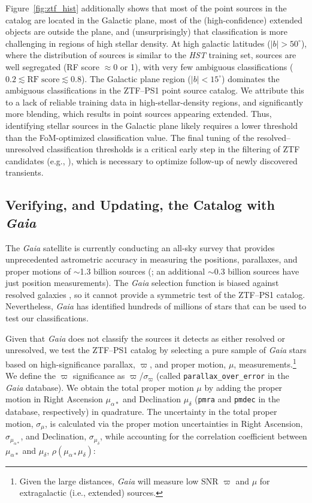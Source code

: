\documentclass[twocolumn]{aastex62}
\begin{document}
\begin{CJK*}{UTF8}{gbsn}
Figure~\ref{fig:ztf_hist} additionally shows that most of the point sources
in the catalog are located in the Galactic plane, most of the
(high-confidence) extended objects are outside the plane, and
(unsurprisingly) that classification is more challenging in regions of high
stellar density. At high galactic latitudes ($|b| > 50^{\circ}$), where the
distribution of sources is similar to the \textit{HST} training set, sources
are well segregated (RF score $\approx$0 or 1), with very few ambiguous
classifications ($0.2 \lesssim \mathrm{RF\;score} \lesssim 0.8$). The
Galactic plane region ($|b| < 15^{\circ}$) dominates the ambiguous
classifications in the ZTF--PS1 point source catalog. We attribute this to a
lack of reliable training data in high-stellar-density regions, and
significantly more blending, which results in point sources appearing
extended. Thus, identifying stellar sources in the Galactic plane likely
requires a lower threshold than the FoM-optimized classification value. The
final tuning of the resolved--unresolved classification thresholds is a
critical early step in the filtering of ZTF candidates (e.g.,
\citealt{Kasliwal:18:ZTF}), which is necessary to optimize follow-up of
newly discovered transients.

\subsection{Verifying, and Updating, the Catalog with \textit{Gaia}}
\label{sec:gaia}

The \textit{Gaia} satellite \citep{Gaia-Collaboration16} is currently
conducting an all-sky survey that provides unprecedented astrometric
accuracy in measuring the positions, parallaxes, and proper motions of
$\sim$1.3 billion sources (\citealt{Gaia-Collaboration18}; an additional
$\sim$0.3 billion sources have just position measurements). The
\textit{Gaia} selection function is biased against resolved galaxies
\citep{Gaia-Collaboration16}, so it cannot provide a symmetric test of the
ZTF--PS1 catalog. Nevertheless, \textit{Gaia} has identified hundreds of
millions of stars that can be used to test our classifications.

Given that \textit{Gaia} does not classify the sources it detects as either
resolved or unresolved, we test the ZTF--PS1 catalog by selecting a pure
sample of \textit{Gaia} stars based on high-significance parallax, $\varpi$,
and proper motion, $\mu$, measurements.\footnote{Given the large distances,
\textit{Gaia} will measure low SNR $\varpi$ and $\mu$ for extragalactic
(i.e., extended) sources.} We define the $\varpi$ significance as
$\varpi$/$\sigma_\varpi$ (called \texttt{parallax\_over\_error} in the
\textit{Gaia} database). We obtain the total proper motion $\mu$ by adding
the proper motion in Right Ascension $\mu_{\alpha\ast}$ and Declination
$\mu_{\delta}$ (\texttt{pmra} and \texttt{pmdec} in the database,
respectively) in quadrature. The uncertainty in the total proper motion,
$\sigma_\mu$, is calculated via the proper motion uncertainties in Right
Ascension, $\sigma_{\mu_{\alpha\ast}}$, and Declination,
$\sigma_{\mu_{\delta}}$, while accounting for the correlation coefficient
between $\mu_{\alpha\ast}$ and $\mu_{\delta}$,
$\rho(\mu_{\alpha\ast}\mu_{\delta})$:


\end{CJK*}
\end{document}
